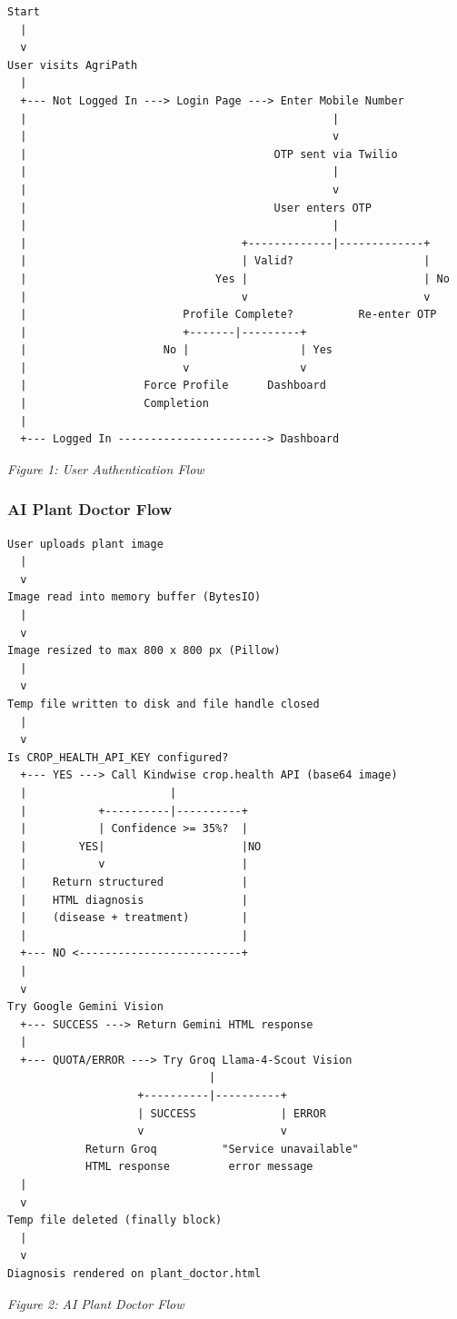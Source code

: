\documentclass[12pt,a4paper]{article}
\begin{document}
\begin{Verbatim}[fontsize=\small, frame=single]
Start
  |
  v
User visits AgriPath
  |
  +--- Not Logged In ---> Login Page ---> Enter Mobile Number
  |                                               |
  |                                               v
  |                                      OTP sent via Twilio
  |                                               |
  |                                               v
  |                                      User enters OTP
  |                                               |
  |                                 +-------------|-------------+
  |                                 | Valid?                    |
  |                             Yes |                           | No
  |                                 v                           v
  |                        Profile Complete?          Re-enter OTP
  |                        +-------|---------+
  |                     No |                 | Yes
  |                        v                 v
  |                  Force Profile      Dashboard
  |                  Completion
  |
  +--- Logged In -----------------------> Dashboard
\end{Verbatim}
\begin{center}
\textit{Figure 1: User Authentication Flow}
\end{center}

\subsubsection*{AI Plant Doctor Flow}

\begin{Verbatim}[fontsize=\small, frame=single]
User uploads plant image
  |
  v
Image read into memory buffer (BytesIO)
  |
  v
Image resized to max 800 x 800 px (Pillow)
  |
  v
Temp file written to disk and file handle closed
  |
  v
Is CROP_HEALTH_API_KEY configured?
  +--- YES ---> Call Kindwise crop.health API (base64 image)
  |                      |
  |           +----------|----------+
  |           | Confidence >= 35%?  |
  |        YES|                     |NO
  |           v                     |
  |    Return structured            |
  |    HTML diagnosis               |
  |    (disease + treatment)        |
  |                                 |
  +--- NO <-------------------------+
  |
  v
Try Google Gemini Vision
  +--- SUCCESS ---> Return Gemini HTML response
  |
  +--- QUOTA/ERROR ---> Try Groq Llama-4-Scout Vision
                               |
                    +----------|----------+
                    | SUCCESS             | ERROR
                    v                     v
            Return Groq          "Service unavailable"
            HTML response         error message
  |
  v
Temp file deleted (finally block)
  |
  v
Diagnosis rendered on plant_doctor.html
\end{Verbatim}
\begin{center}
\textit{Figure 2: AI Plant Doctor Flow}
\end{center}
\end{document}
